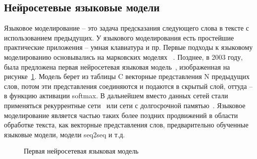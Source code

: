 \subsection{Нейросетевые языковые модели}

Языковое моделирование -- это задача предсказания следующего слова в тексте с использованием предыдущих. У языкового моделирования есть простейшие практические приложения -- умная клавиатура и пр. Первые подходы к языковому моделированию основывались на марковских моделях~\cite{kneser_1995} . Позднее, в 2003 году, была предложена первая нейросетевая языковая модель~\cite{bengio_2003}, изображенная на рисунке~\ref{fig:Neuro1-Feedforward}. 
Модель берет из таблицы C векторные представления N предыдущих слов, потом эти представления соединяются и подаются в скрытый слой, оттуда -- в функцию активации softmax. В дальнейшем вместо данных сетей стали применяться рекуррентные сети~\cite{mikolov_2010} или сети с долгосрочной памятью~\cite{hochreiter_1997}.%
Языковое моделирование является частью таких более поздних продвижений в области обработке текста, как векторные представления слов, предварительно обученные языковые модели, модели seq2seq и т.д.

\begin{figure}[ht]
 \caption{Первая нейросетевая языковая модель}\label{fig:Neuro1-Feedforward}
\end{figure}


